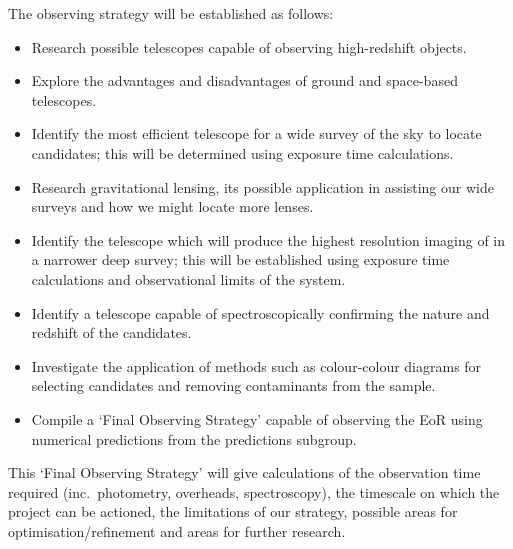 	The observing strategy will be established as follows:
	\begin{itemize}
		\item Research possible telescopes capable of observing high-redshift objects.
		\item Explore the advantages and disadvantages of ground and space-based telescopes.
		\item Identify the most efficient telescope for a wide survey of the sky to locate candidates; this will be determined using exposure time calculations.
		\item Research gravitational lensing, its possible application in assisting our wide surveys and how we might locate more lenses.
		\item Identify the telescope which will produce the highest resolution imaging of in a narrower deep survey; this will be established using exposure time calculations and observational limits of the system.
		\item Identify a telescope capable of spectroscopically confirming the nature and redshift of the candidates.
		\item Investigate the application of methods such as colour-colour diagrams for selecting candidates and removing contaminants from the sample.
		\item Compile a ‘Final Observing Strategy’ capable of observing the EoR using numerical predictions from the predictions subgroup.
	\end{itemize}
	This `Final Observing Strategy' will give calculations of the observation time required (inc.\ photometry, overheads, spectroscopy), the timescale on which the project can be actioned, the limitations of our strategy, possible areas for optimisation/refinement and areas for further research.

